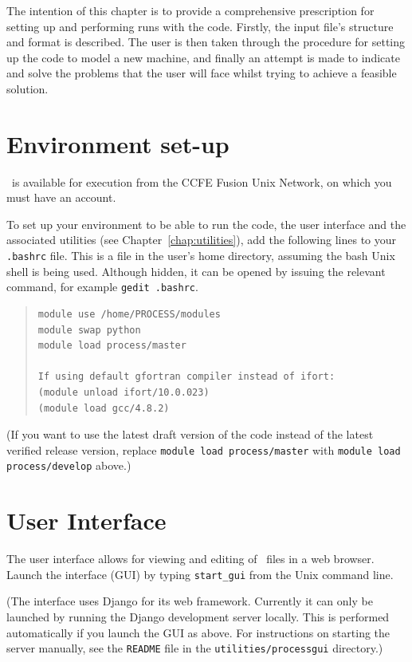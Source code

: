 \label{chap:run}

The intention of this chapter is to provide a comprehensive prescription for
setting up and performing runs with the code.  Firstly, the input file's
structure and format is described. The user is then taken through the
procedure for setting up the code to model a new machine, and finally an
attempt is made to indicate and solve the problems that the user will face
whilst trying to achieve a feasible solution.

\section{Environment set-up}
\label{sec:run_environment}

 \process\ is available for execution from the CCFE Fusion Unix Network, on which you must have an account.

To set up your environment to be able to run the code, the user interface and the associated
utilities (see Chapter~\ref{chap:utilities}), add the following lines to your \texttt{.bashrc} file.  This is a file in the user's home directory, assuming the bash Unix shell is being used.  Although hidden, it can be opened by issuing the relevant command, for example \texttt{gedit .bashrc}.
\begin{quote}
\begin{verbatim}
module use /home/PROCESS/modules
module swap python
module load process/master

If using default gfortran compiler instead of ifort:
(module unload ifort/10.0.023)
(module load gcc/4.8.2)
\end{verbatim}
\end{quote}
(If you want to use the latest draft version of the code instead of the latest verified release version, replace \texttt{module load process/master} with \texttt{module load process/develop} above.)

\section{User Interface}
\label{sec:gui}
The user interface allows for viewing and editing of \indat\ files in a web browser. Launch the interface (GUI) by typing \verb+start_gui+ from the Unix command line.

(The interface uses Django for its web framework. Currently it can only be
launched by running the Django development server locally. This is performed
automatically if you launch the GUI as above. For instructions on starting the server manually, see the \verb|README| file in the \texttt{utilities/processgui} directory.)

